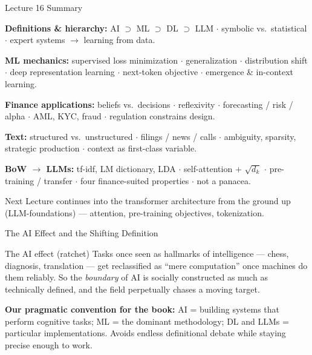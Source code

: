 \documentclass[9pt,t]{beamer}
\begin{document}
\begin{frame}{Lecture 16 Summary}

\textbf{Definitions \& hierarchy:}
AI $\supset$ ML $\supset$ DL $\supset$ LLM $\cdot$ symbolic vs.\ statistical $\cdot$
expert systems $\to$ learning from data.

\medskip
\textbf{ML mechanics:}
supervised loss minimization $\cdot$ generalization $\cdot$ distribution shift $\cdot$
deep representation learning $\cdot$ next-token objective $\cdot$ emergence \& in-context learning.

\medskip
\textbf{Finance applications:}
beliefs vs.\ decisions $\cdot$ reflexivity $\cdot$ forecasting / risk / alpha $\cdot$
AML, KYC, fraud $\cdot$ regulation constrains design.

\medskip
\textbf{Text:}
structured vs.\ unstructured $\cdot$ filings / news / calls $\cdot$ ambiguity,
sparsity, strategic production $\cdot$ context as first-class variable.

\medskip
\textbf{BoW $\to$ LLMs:}
tf-idf, LM dictionary, LDA $\cdot$ self-attention $+$ $\sqrt{d_k}$ $\cdot$
pre-training / transfer $\cdot$ four finance-suited properties $\cdot$ \alert{not a panacea}.

\medskip
\begin{block}{Next}
Lecture continues into the transformer architecture from the ground up
(LLM-foundations) --- attention, pre-training objectives, tokenization.
\end{block}
\end{frame}


\begin{frame}[noframenumbering]{The AI Effect and the Shifting Definition}

\begin{block}{The AI effect (ratchet)}
Tasks once seen as hallmarks of intelligence --- chess, diagnosis, translation ---
get reclassified as ``mere computation'' once machines do them reliably. So the
\emph{boundary} of AI is socially constructed as much as technically defined, and
the field perpetually chases a moving target.
\end{block}

\medskip
\textbf{Our pragmatic convention for the book:} AI = building systems that perform
cognitive tasks; ML = the dominant methodology; DL and LLMs = particular
implementations. Avoids endless definitional debate while staying precise enough to work.
\end{frame}
\end{document}
